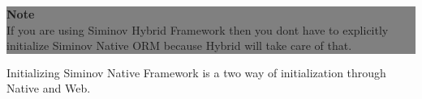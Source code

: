 	
		\begin{center}
			\colorbox{grey}{
				\parbox[t]{.8\linewidth}{
					\fontsize{11pt}{11pt}\selectfont %
					\vspace*{0.1cm} %
		
					\hfill \textbf{Note} \\
					If you are using Siminov Hybrid Framework then you dont have to explicitly initialize Siminov Native ORM because Hybrid will take care of that.

					\vspace*{0.0cm} %
				}
			}

		\end{center}


Initializing Siminov Native Framework is a two way of initialization through Native and Web.


